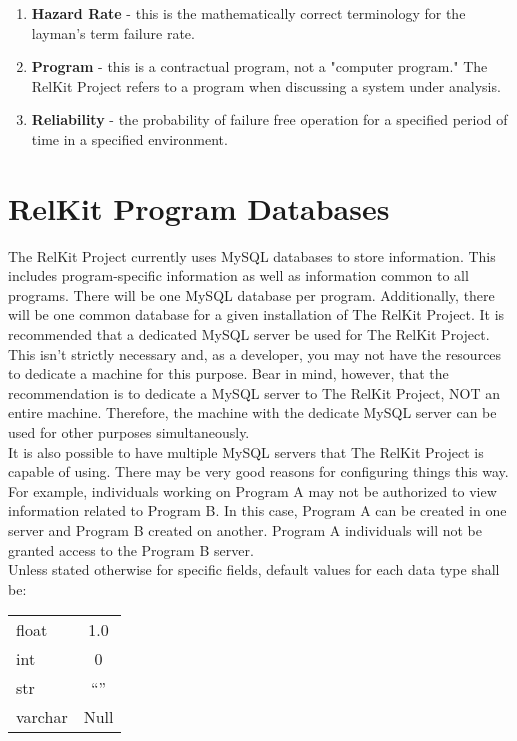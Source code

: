 \documentclass[11pt, 12pt, twoside, onecolumn]{article}
\begin{document}
\begin{enumerate}
	\item \textbf{Hazard Rate} - this is the mathematically correct terminology for the layman's term failure rate.
	\item \textbf{Program} - this is a contractual program, not a "computer program."  The RelKit Project refers to a program when discussing a system under analysis.
	\item \textbf{Reliability} - the probability of failure free operation for a specified period of time in a specified environment.
\end{enumerate}

\section{\bf \Large RelKit Program Databases}

\noindent The RelKit Project currently uses MySQL databases to store information.  This includes program-specific information as well as information common to all programs.  There will be one MySQL database per program.  Additionally, there will be one common database for a given installation of The RelKit Project.  It is recommended that a dedicated MySQL server be used for The RelKit Project.  This isn't strictly necessary and, as a developer, you may not have the resources to dedicate a machine for this purpose.  Bear in mind, however, that the recommendation is to dedicate a MySQL server to The RelKit Project, NOT an entire machine.  Therefore, the machine with the dedicate MySQL server can be used for other purposes simultaneously. \\

\noindent It is also possible to have multiple MySQL servers that The RelKit Project is capable of using.  There may be very good reasons for configuring things this way.  For example, individuals working on Program A may not be authorized to view information related to Program B.  In this case, Program A can be created in one server and Program B created on another.  Program A individuals will not be granted access to the Program B server. \\

\noindent Unless stated otherwise for specific fields, default values for each data type shall be:

\bigskip
\begin{tabular}{l c}
float & 1.0 \\
int & 0 \\
str & ``'' \\
varchar & Null \\
\end{tabular}
\bigskip
\end{document}
